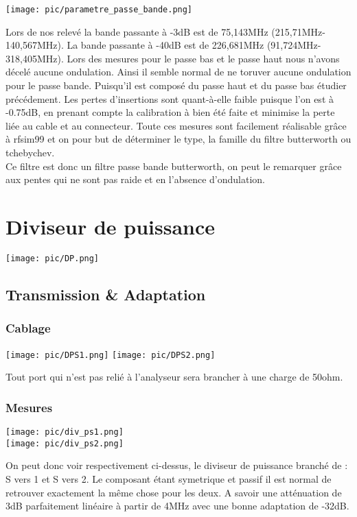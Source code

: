 \documentclass[a4paper,12pt]{report}            %
\begin{document}
\begin{center}\texttt{[image: pic/parametre\_passe\_bande.png]}\\ \end{center}
Lors de nos relevé la bande passante à -3dB est de 75,143MHz (215,71MHz-140,567MHz). 
La bande passante à -40dB est de 226,681MHz (91,724MHz-318,405MHz). Lors des mesures pour
le passe bas et le passe haut nous n'avons décelé aucune ondulation. Ainsi il semble normal 
de ne toruver aucune ondulation pour le passe bande. Puisqu'il est composé du passe haut et
du passe bas étudier précédement.
Les pertes d'insertions sont quant-à-elle faible puisque l'on est à -0.75dB, en prenant compte
la calibration à bien été faite et minimise la perte liée au cable et au connecteur.
Toute ces mesures sont facilement réalisable grâce à rfsim99 et on pour but de déterminer
le type, la famille du filtre butterworth ou tchebychev.\\
Ce filtre est donc un filtre passe bande butterworth, on peut le remarquer grâce aux pentes 
qui ne sont pas raide et en l'absence d'ondulation. 


\chapter{Diviseur de puissance}

\begin{center}\texttt{[image: pic/DP.png]}\\ \end{center}

\section{Transmission \& Adaptation}

\subsection{Cablage}
\begin{center}
	\texttt{[image: pic/DPS1.png]}
      \texttt{[image: pic/DPS2.png]}
\end{center}
Tout port qui n'est pas relié à l'analyseur sera brancher à une charge de 50ohm.
\newpage
\subsection{Mesures}
\begin{center}
	\texttt{[image: pic/div\_ps1.png]} \\
	\texttt{[image: pic/div\_ps2.png]}
\end{center}
On peut donc voir respectivement ci-dessus, le diviseur de puissance branché de :
S vers 1 et S vers 2. Le composant étant symetrique et passif il est normal de retrouver
exactement la même chose pour les deux. A savoir une atténuation de 3dB parfaitement linéaire
à partir de 4MHz avec une bonne adaptation de -32dB.
\end{document}

